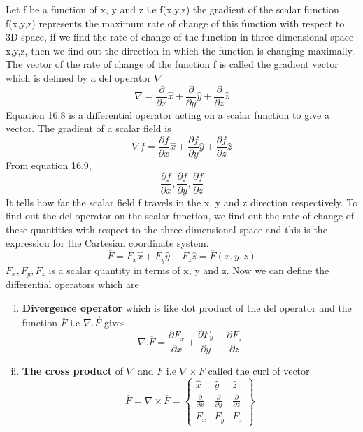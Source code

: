 Let f be a function of x, y and z i.e f(x,y,z) the gradient of the scalar function f(x,y,z) represents the maximum rate of change of this function with respect to 3D space, if we find the rate of change of the function in three-dimensional space x,y,z, then we find out the direction in which the function is changing maximally. The vector of the rate of change of the function f is called the gradient vector which is defined by a del operator $\nabla$
\begin{equation}
\nabla = \frac{\partial}{\partial x}\hat{x} + \frac{\partial}{\partial y}\hat{y} + \frac{\partial}{\partial z}\hat{z}
\end{equation} 
Equation 16.8 is a differential operator acting on a scalar function to give a vector. The gradient of a scalar field is 
\begin{equation}
\nabla f = \frac{\partial f}{\partial x}\hat{x} + \frac{\partial f}{\partial y}\hat{y} + \frac{\partial f}{\partial z}\hat{z}
\end{equation} 
From equation 16.9,
\begin{equation*}
\frac{\partial f}{\partial x}, \frac{\partial f}{\partial y}, \frac{\partial f}{\partial z}
\end{equation*}
It tells how far the scalar field f travels in the x, y and z direction respectively. To find out the del operator on the scalar function, we find out the rate of change of these quantities with respect to the three-dimensional space and this is the expression for the Cartesian coordinate system.
\begin{equation}
\overline{F}  =  F_{x}\hat{x} + F_{y}\hat{y} + F_{z}\hat{z}  =   \overline{F}(x,y,z)
\end{equation}
$F_{x}, F_{y}, F_{z}$ is a scalar quantity in terms of x, y and z. Now we can define the differential operators which are
\begin{enumerate}[(i)]
\item \textbf{Divergence operator} which is like dot product of the del operator and the function $\overline{F}$ i.e $\nabla.\overrightarrow{F}$ gives
\begin{equation}
\nabla.\overline{F} = \frac{\partial F_{x}}{\partial x} + \frac{\partial F_{y}}{\partial y} + \frac{\partial F_{z}}{\partial z}
\end{equation}
\item \textbf{The cross product} of $\nabla$ and $\overline{F}$ i.e $\nabla \times \overline{F}$ called the curl of vector
\begin{dmath*}
\overline{F} = \nabla \times \overline{F} = 
\begin{Bmatrix}
\hat{x} & \hat{y} & \hat{z}\\
\frac{\partial}{\partial x} & \frac{\partial}{\partial y} & \frac{\partial}{\partial z}\\
F_{x} & F_{y} & F_{z}
\end{Bmatrix}
\end{dmath*}
\end{enumerate}
